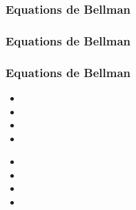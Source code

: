 \documentclass{formation}
\begin{document}
\begin{frame}
  \frametitle{Equations de Bellman}
\end{frame}

\begin{frame}
  \frametitle{Equations de Bellman}
\end{frame}

\begin{frame}
  \frametitle{Equations de Bellman}

  
  \begin{itemize}
  \item 
  \item 
  \item 
  \item 
  \end{itemize}

  \begin{minipage}[l]{0.49\linewidth}
  \end{minipage}\hfill
  \begin{minipage}[l]{0.49\linewidth}
  \end{minipage}\hfill

  \begin{minipage}[l]{0.49\linewidth}
      \begin{itemize}
      \item 
      \item 
      \item 
      \item 
      \end{itemize}
  \end{minipage}\hfill
  \begin{minipage}[l]{0.49\linewidth}
  \end{minipage}\hfill

\end{frame}
\end{document}
